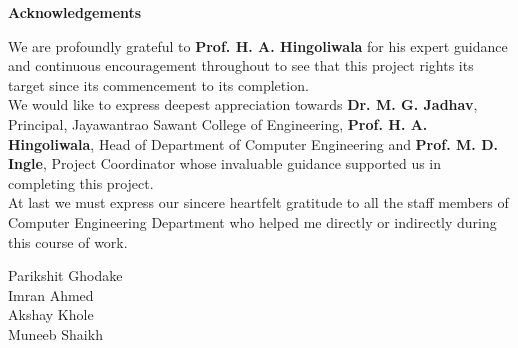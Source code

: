 \begin{center}
\thispagestyle{empty}
\LARGE{\textbf{Acknowledgements}}\\[1cm]
\end{center}
\linespread{1.13}
\hspace*{0.82cm}\large{We are profoundly grateful to \textbf{Prof. H. A. Hingoliwala} for his expert guidance
and continuous encouragement throughout to see that this project rights its
target since its commencement to its completion.}\\[1cm]
\hspace*{0.82cm}\large{We would like to express deepest appreciation towards \textbf{Dr. M. G. Jadhav},
Principal, Jayawantrao Sawant College of Engineering, \textbf{Prof. H. A. Hingoliwala}, 
Head of Department of Computer Engineering and \textbf{Prof. M. D. Ingle}, Project Coordinator whose
invaluable guidance supported us in completing this project.}\\[1cm]
\hspace*{0.82cm}\large{At last we must express our sincere heartfelt gratitude to all the staff members
of Computer Engineering Department who helped me directly or
indirectly during this course of work.}\\[1.0cm]
\begin{flushright}
{
Parikshit Ghodake\\
Imran Ahmed\\
Akshay Khole\\
Muneeb Shaikh
}
\end{flushright}
\newpage
